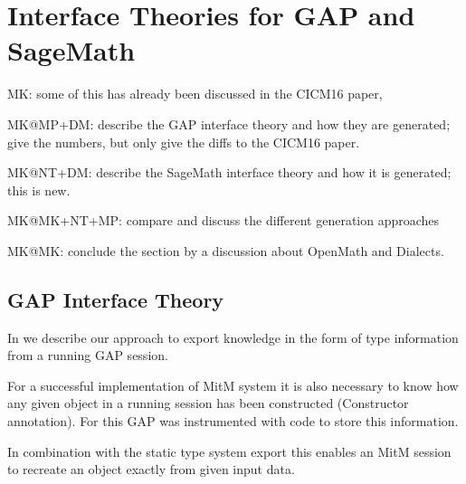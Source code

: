 \section{Interface Theories for GAP and SageMath}\label{sec:ift}
\begin{todolist}{MK: some of this has already been discussed in the CICM16 paper, }
\item MK@MP+DM: describe the GAP interface theory and how they are generated; give the
numbers, but only give the diffs to the CICM16 paper.

\item MK@NT+DM: describe the SageMath interface theory and how it is generated; this is
  new. 
\item MK@MK+NT+MP: compare and discuss the different generation approaches
\item MK@MK: conclude the section by a discussion about OpenMath and Dialects.
\end{todolist}


\subsection{GAP Interface Theory}

In \cite{DehKohKon:iop16} we describe our approach to export
knowledge in the form of type information from a running GAP session.

For a successful implementation of MitM system it is also necessary to
know how any given object in a running session has been constructed
(Constructor annotation). For this GAP was instrumented with code to store
this information.

In combination with the static type system export this enables an MitM session
to recreate an object exactly from given input data.



